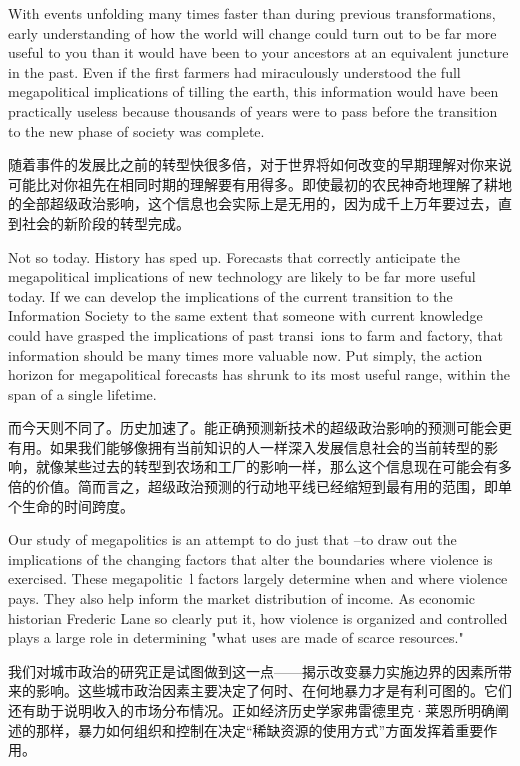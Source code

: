 \begin{Parallel}{97mm}{45mm}
  \ParallelLText
  {With events unfolding many times faster than during previous transformations, early understanding of how the world will change could turn out to be far more useful to you than it would have been to your ancestors at an equivalent juncture in the past. Even if the first farmers had miraculously understood the full megapolitical implications of tilling the earth, this information would have been practically useless because thousands of years were to pass before the transition to the new phase of society was complete.}
  
  \ParallelRText
  {随着事件的发展比之前的转型快很多倍，对于世界将如何改变的早期理解对你来说可能比对你祖先在相同时期的理解要有用得多。即使最初的农民神奇地理解了耕地的全部超级政治影响，这个信息也会实际上是无用的，因为成千上万年要过去，直到社会的新阶段的转型完成。}
  \ParallelPar


  \ParallelLText
  {Not so today. History has sped up. Forecasts that correctly anticipate the megapolitical implications of new technology are likely to be far more useful today. If we can develop the implications of the current transition to the Information Society to the same extent that someone with current knowledge could have grasped the implications of past transi~ions to farm and factory, that information should be many times more valuable now. Put simply, the action horizon for megapolitical forecasts has shrunk to its most useful range, within the span of a single lifetime.}
  
  \ParallelRText
  {而今天则不同了。历史加速了。能正确预测新技术的超级政治影响的预测可能会更有用。如果我们能够像拥有当前知识的人一样深入发展信息社会的当前转型的影响，就像某些过去的转型到农场和工厂的影响一样，那么这个信息现在可能会有多倍的价值。简而言之，超级政治预测的行动地平线已经缩短到最有用的范围，即单个生命的时间跨度。}
  \ParallelPar


  \ParallelLText
  {Our study of megapolitics is an attempt to do just that --to draw out the implications of the changing factors that alter the boundaries where violence is exercised. These megapolitic~l factors largely determine when and where violence pays. They also help inform the market distribution of income. As economic historian Frederic Lane so clearly put it, how violence is organized and controlled plays a large role in determining "what uses are made of scarce resources." }
  
  \ParallelRText
  {我们对城市政治的研究正是试图做到这一点——揭示改变暴力实施边界的因素所带来的影响。这些城市政治因素主要决定了何时、在何地暴力才是有利可图的。它们还有助于说明收入的市场分布情况。正如经济历史学家弗雷德里克·莱恩所明确阐述的那样，暴力如何组织和控制在决定“稀缺资源的使用方式”方面发挥着重要作用。}
  \ParallelPar


\end{Parallel}
